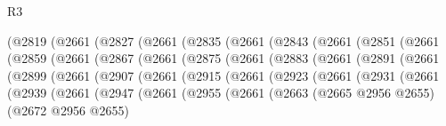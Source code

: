 \begin{lexlean}{R3}
\begin{coremodule}
              (@2819
                (@2661
                  (@2827
                    (@2661
                      (@2835
                        (@2661
                          (@2843
                            (@2661
                              (@2851
                                (@2661
                                  (@2859
                                    (@2661
                                      (@2867
                                        (@2661
                                          (@2875
                                            (@2661
                                              (@2883
                                                (@2661
                                                  (@2891
                                                    (@2661
                                                      (@2899
                                                        (@2661
                                                          (@2907
                                                            (@2661
                                                              (@2915
                                                                (@2661
                                                                  (@2923
                                                                    (@2661
                                                                      (@2931
                                                                        (@2661
                                                                          (@2939
                                                                            (@2661
                                                                              (@2947
                                                                                (@2661
                                                                                  (@2955
                                                                                    (@2661
                                                                                      (@2663
                                                                                        (@2665
                                                                                          @2956
                                                                                          @2655)
                                                                                        (@2672
                                                                                          @2956
                                                                                          @2655)

\end{coremodule}
\end{lexlean}
